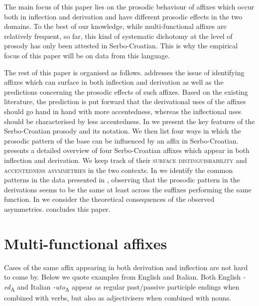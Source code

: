 \documentclass[output=paper]{langsci/langscibook}
\begin{document}
The main focus of this paper lies on the prosodic behaviour of affixes which occur both in inflection and derivation and have different prosodic effects in the two domains. To the best of our knowledge, while multi-functional affixes are relatively frequent, so far, this kind of systematic dichotomy at the level of prosody has only been attested in Serbo-Croatian. This is why the empirical focus of this paper will be on data from this language.\largerpage[1]

The rest of this paper is organised as follows.  addresses the issue of identifying affixes which can surface in both inflection and derivation as well as the predictions concerning the prosodic effects of such affixes. Based on the existing literature, the prediction is put forward that the derivational uses of the affixes should go hand in hand with more accentedness, whereas the inflectional uses should be characterised by less accentedness. In  we present the key features of the Serbo-Croatian prosody and its notation. We then list four ways in which the prosodic pattern of the base can be influenced by an affix in Serbo-Croatian.  presents a detailed overview of four Serbo-Croatian affixes which appear in both inflection and derivation. We keep track of their \textsc{surface distinguishability} and  \textsc{accentedness asymmetries} in the two contexts. In  we identify the common patterns in the data presented in , observing that the prosodic pattern in the derivations seems to be the same at least across the suffixes performing the same function. In  we consider the theoretical consequences of the observed asymmetries.  concludes this paper.

\section{Multi-functional affixes}\label{sec:simonovic:2}

Cases of the same affix appearing in both derivation and inflection are not hard to come by. Below we quote examples from English and Italian. Both English \textit{-ed}\textsubscript{A} and Italian \textit{-uto}\textsubscript{A} appear as regular past/passive participle endings when combined with verbs, but also as adjectivisers when combined with nouns.
\end{document}
